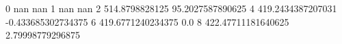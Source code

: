 0 nan nan
1 nan nan
2 514.8798828125 95.2027587890625
4 419.2434387207031 -0.433685302734375
6 419.6771240234375 0.0
8 422.47711181640625 2.79998779296875
